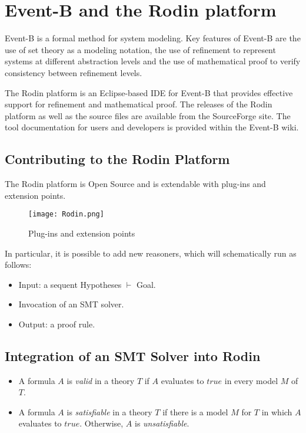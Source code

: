 \section{Event-B and the Rodin platform}
Event-B is a formal method for system modeling. Key features of Event-B are the use of set theory as a modeling notation, the use of refinement to represent systems at different abstraction levels and the use of mathematical proof to verify consistency between refinement levels.

The Rodin platform is an Eclipse\cite{ECLIPSE}-based IDE for Event-B that provides effective support for refinement and mathematical proof. The releases\cite{RODIN} of the Rodin platform as well as the source files\cite{SOURCES} are available from the SourceForge site. The tool documentation for users and developers is provided within the Event-B wiki\cite{WIKI}.

\subsection{Contributing to the Rodin Platform}
The Rodin platform is Open Source and is extendable with plug-ins and extension points.

\begin{figure}
\centering
\texttt{[image: Rodin.png]}
\caption{Plug-ins and extension points} 
\label{Fig:Rodin Platform}
\end{figure}

In particular, it is possible to add new reasoners, which will schematically run as follows:
\begin{itemize}
\item Input: a sequent Hypotheses $\vdash$ Goal.
\item Invocation of an SMT solver.
\item Output: a proof rule.
\end{itemize}

\subsection{Integration of an SMT Solver into Rodin}
\begin{itemize}
\item A formula $A$ is \textit{valid} in a theory $T$ if $A$ evaluates to $true$ in every model $M$ of $T$.
\item A formula $A$ is \textit{satisfiable} in a theory $T$ if there is a model $M$ for $T$ in which $A$ evaluates to $true$. Otherwise, $A$ is \textit{unsatisfiable}.
\end{itemize}


